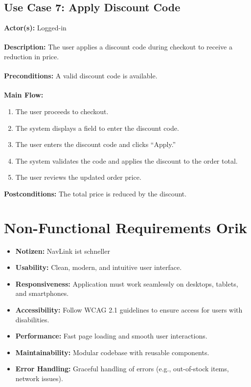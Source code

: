 \documentclass[a4paper,12pt]{article}
\begin{document}
	\subsection*{Use Case 7: Apply Discount Code}
	\textbf{Actor(s):} Logged-in \\ \\
	\textbf{Description:} The user applies a discount code during checkout to receive a \\ reduction in
	price. \\ \\
	\textbf{Preconditions:} A valid discount code is available. \\ \\
	\textbf{Main Flow:}
	\begin{enumerate}
  		\item The user proceeds to checkout.
  		\item The system displays a field to enter the discount code.
  		\item The user enters the discount code and clicks ``Apply.''
  		\item The system validates the code and applies the discount to the order total.
  		\item The user reviews the updated order price.
	\end{enumerate}
	\textbf{Postconditions:} The total price is reduced by the discount.


	\section{Non-Functional Requirements Orik}
	\begin{itemize}
			\item \textbf{Notizen:} NavLink ist schneller
		\item \textbf{Usability:} Clean, modern, and intuitive user interface.
		\item \textbf{Responsiveness:} Application must work seamlessly on desktops, tablets, and smartphones.
		\item \textbf{Accessibility:} Follow WCAG 2.1 guidelines to ensure access for users with disabilities.
		\item \textbf{Performance:} Fast page loading and smooth user interactions.
		\item \textbf{Maintainability:} Modular codebase with reusable components.
		\item \textbf{Error Handling:} Graceful handling of errors (e.g., out-of-stock items, network issues).
	\end{itemize}
	
\end{document}
